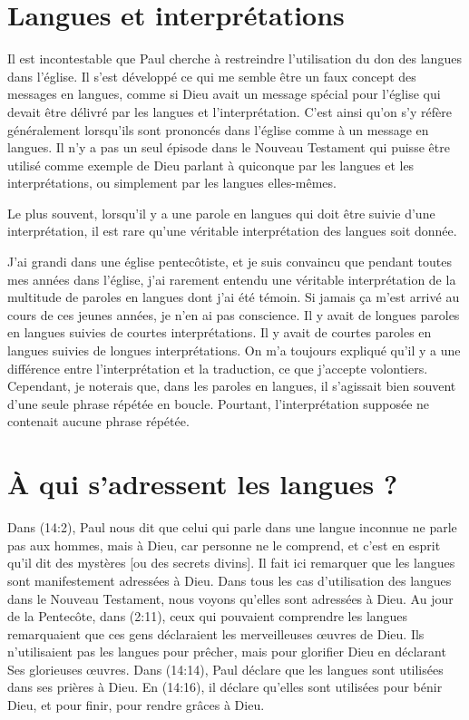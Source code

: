 \section{Langues et interpr\'etations}

Il est incontestable que Paul cherche à restreindre l'utilisation
 du don des langues dans l'église. Il s'est développé ce qui me semble
 être un faux concept des \og messages \fg{} en langues,
 comme si Dieu avait un message spécial pour l'église qui devait être délivré
 par les langues et l'interprétation. C'est ainsi qu'on s'y réfère
 généralement lorsqu'ils sont prononcés dans l'église
 \ocadr comme à un message en langues.
 Il n'y a pas un seul épisode dans le Nouveau Testament
 qui puisse être utilisé comme exemple de Dieu parlant à quiconque
 par les langues et les interprétations, ou simplement par les langues
 elles-mêmes.

Le plus souvent, lorsqu'il y a une parole en langues qui doit être suivie
 d'une interprétation, il est rare qu'une véritable interprétation
 des langues soit donnée.

J'ai grandi dans une église pentecôtiste, et je suis convaincu que pendant
 toutes mes années dans l'église, j'ai rarement entendu une véritable
 interprétation de la multitude de paroles en langues dont j'ai été témoin.
 Si jamais ça m'est arrivé au cours de ces jeunes années, je n'en ai pas conscience.
 Il y avait de longues paroles en langues suivies de courtes interprétations.
 Il y avait de courtes paroles en langues suivies de longues interprétations.
 On m'a toujours expliqué qu'il y a une différence entre l'interprétation
 et la traduction, ce que j'accepte volontiers. Cependant, je noterais que,
 dans les paroles en langues, il s'agissait bien souvent d'une seule phrase
 répétée en boucle. Pourtant, l'interprétation supposée ne contenait aucune phrase
 répétée.


\section{\`A qui s'adressent les langues ?}


Dans (14:2), Paul nous dit que celui qui parle dans une
 langue inconnue \og ne parle pas aux hommes, mais à Dieu, car personne
 ne le comprend, et c'est en esprit qu'il dit des mystères
 [ou des secrets divins]. \fg{} Il fait ici remarquer que les langues
 sont manifestement adressées à Dieu. Dans tous les cas d'utilisation
 des langues dans le Nouveau Testament, nous voyons qu'elles sont adressées
 à Dieu. Au jour de la Pentecôte, dans (2:11),
 ceux qui pouvaient comprendre les langues remarquaient que ces gens
 déclaraient les merveilleuses œuvres de Dieu. Ils n'utilisaient pas
 les langues pour prêcher, mais pour glorifier Dieu
 en déclarant Ses glorieuses œuvres.
 Dans (14:14), Paul déclare que les langues sont utilisées
 dans ses prières à Dieu. En (14:16), il déclare
 qu'elles sont utilisées pour bénir Dieu, et pour finir,
 pour rendre grâces à Dieu.
 \nowidow

